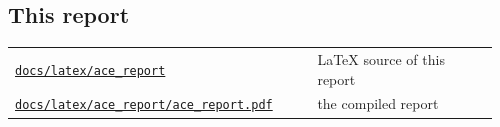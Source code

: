 {\subsection*{This report}
\begin{longtable}{@{}p{0.60\linewidth}p{0.36\linewidth}@{}}
\href{https://github.com/sanjeevkrishnaa/Compiler-Driven-ACE/tree/codex/ace-scheduler-correctness/docs/latex/ace_report}{\nolinkurl{docs/latex/ace_report}} & LaTeX source of this report \\
\href{https://github.com/sanjeevkrishnaa/Compiler-Driven-ACE/blob/codex/ace-scheduler-correctness/docs/latex/ace_report/ace_report.pdf}{\nolinkurl{docs/latex/ace_report/ace_report.pdf}} & the compiled report \\
\end{longtable}
}
